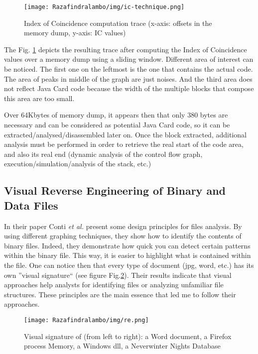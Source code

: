 \begin{figure}[!h]
\center
    \texttt{[image: Razafindralambo/img/ic-technique.png]}
    \caption{Index of Coincidence computation trace (x-axis: offsets in the memory dump, y-axis: IC values)}
    \label{fig:ic-technique}
\end{figure}
The Fig. \ref{fig:ic-technique} depicts the resulting trace after computing the Index of
Coincidence values over a memory dump using a sliding window. Different area of interest can be noticed. The first one on the leftmost is the
one that contains the actual code. The area of peaks in middle of the graph are just noises. And the
third area does not reflect Java Card code because the width of the multiple blocks that compose this
area are too small.

Over 64Kbytes of memory dump, it appears then that only 380 bytes are necessary and can be considered as
potential Java Card code, so it can be extracted/analysed/disassembled later on.  Once the block
extracted, additional analysis must be performed in order to retrieve the real start of the code
area, and also its real end (dynamic analysis of the control flow graph,
execution/simulation/analysis of the stack, etc.)

\subsection{Visual Reverse Engineering of Binary and Data Files}
\label{subsection:visualreverse}

In their paper Conti \textit{et al.} \cite{Conti:2008:VRE:1431913.1431914} present some design
principles for files analysis. By using different graphing techniques, they show how to identify the
contents of binary files.  Indeed, they demonstrate how quick you can detect certain patterns within
the binary file. This way, it is easier to highlight what is contained within the file. One can notice then that every type
of document (jpg, word, etc.) has its own ''visual signature`` (see figure Fig.\ref{fig:re}). Their results
indicate that visual approaches help analysts for identifying files or analyzing unfamiliar file
structures. These principles are the main essence that led me to follow their approaches.

\begin{figure}[!h]
\center
    \texttt{[image: Razafindralambo/img/re.png]}
    \caption{Visual signature of (from left to right): a Word document, a Firefox process Memory, a Windows dll, a
    Neverwinter Nights Database}
    \label{fig:re}
\end{figure}






